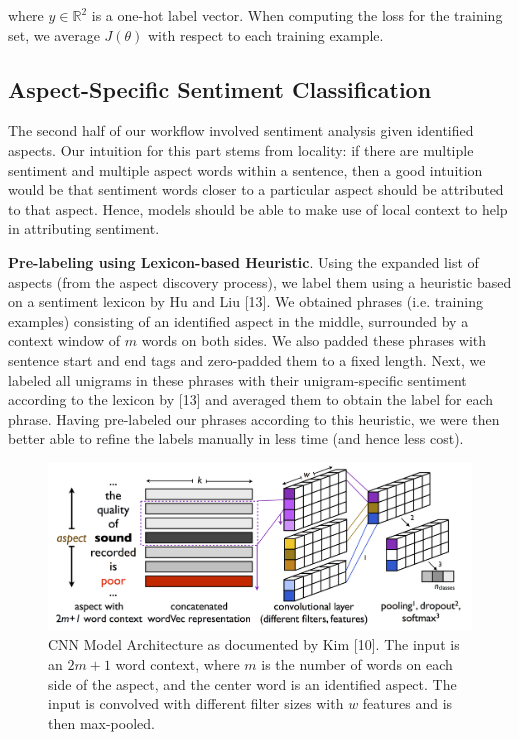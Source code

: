 \documentclass{article} %
\begin{document}
where $y \in \mathbb{R}^2$ is a one-hot label vector. When computing the loss for the training set, we average $J(\theta)$ with respect to each training example.

\subsection{Aspect-Specific Sentiment Classification}
The second half of our workflow involved sentiment analysis given identified aspects. Our intuition for this part stems from locality: if there are multiple sentiment and multiple aspect words within a sentence, then a good intuition would be that sentiment words closer to a particular aspect should be attributed to that aspect. Hence, models should be able to make use of local context to help in attributing sentiment.

\textbf{Pre-labeling using Lexicon-based Heuristic}.
Using the expanded list of aspects (from the aspect discovery process), we label them using a heuristic based on a sentiment lexicon by Hu and Liu [13]. We obtained phrases (i.e. training examples) consisting of an identified aspect in the middle, surrounded by a context window of $m$ words on both sides. We also padded these phrases with sentence start and end tags and zero-padded them to a fixed length. Next, we labeled all unigrams in these phrases with their unigram-specific sentiment according to the lexicon by [13] and averaged them to obtain the label for each phrase. Having pre-labeled our phrases according to this heuristic, we were then better able to refine the labels manually in less time (and hence less cost).


\begin{figure}[ht]
\begin{center}
\includegraphics[width=\columnwidth]{model_architecture.png}
\end{center}
\caption{CNN Model Architecture as documented by Kim [10]. The input is an $2m+1$ word context, where $m$ is the number of words on each side of the aspect, and the center word is an identified aspect. The input is convolved with different filter sizes with $w$ features and is then max-pooled.}
\label{architecture}
\end{figure}
\end{document}

